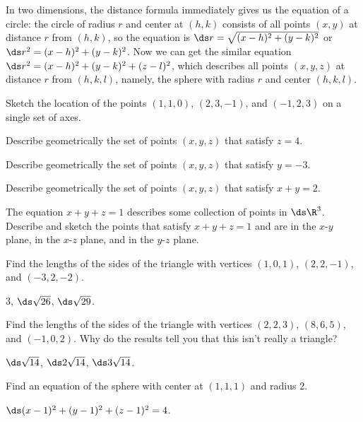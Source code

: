 In two dimensions, the distance formula immediately gives us the
equation of a circle: the circle of radius $r$ and center at $(h,k)$
consists of all points $(x,y)$ at distance $r$ from $(h,k)$, so the
equation is $\ds r=\sqrt{(x-h)^2+(y-k)^2}$ or $\ds r^2=(x-h)^2+(y-k)^2$. Now
we can get the similar equation $\ds r^2=(x-h)^2+(y-k)^2+(z-l)^2$, which
describes all points $(x,y,z)$ at distance $r$ from $(h,k,l)$, namely,
the sphere with radius $r$ and center $(h,k,l)$.

\begin{exercises}

\begin{exercise} Sketch the location of the points $(1,1,0)$, $(2,3,-1)$,
and $(-1,2,3)$ on a single set of axes.

\begin{exercise} Describe geometrically the set of points $(x,y,z)$ that
satisfy $z=4$.

\begin{exercise} Describe geometrically the set of points $(x,y,z)$ that
satisfy $y=-3$.

\begin{exercise} Describe geometrically the set of points $(x,y,z)$ that
satisfy $x+y=2$.

\begin{exercise} The equation $x+y+z=1$ describes some collection of points
in $\ds \R^3$. Describe and sketch the points that satisfy $x+y+z=1$ and
are in the $x$-$y$ plane, in the $x$-$z$ plane, and in the 
$y$-$z$ plane.

\begin{exercise} Find the lengths of the sides of the triangle with 
vertices $(1,0,1)$, $(2,2,-1)$, and $(-3,2,-2)$.
\begin{answer} $3$, $\ds \sqrt{26}$, $\ds \sqrt{29}$.
\end{answer}\end{exercise}

\begin{exercise} Find the lengths of the sides of the triangle with 
vertices $(2,2,3)$, $(8,6,5)$, and $(-1,0,2)$. Why do the results tell
you that this isn't really a triangle?
\begin{answer} $\ds \sqrt{14}$, $\ds 2\sqrt{14}$, $\ds 3\sqrt{14}$.
\end{answer}\end{exercise}

\begin{exercise} Find an equation of the sphere with center at $(1,1,1)$ and
radius 2.
\begin{answer} $\ds (x-1)^2+(y-1)^2+(z-1)^2=4$.
\end{answer}\end{exercise}


\end{exercise}
\end{exercise}
\end{exercise}
\end{exercise}
\end{exercise}
\end{exercises}

